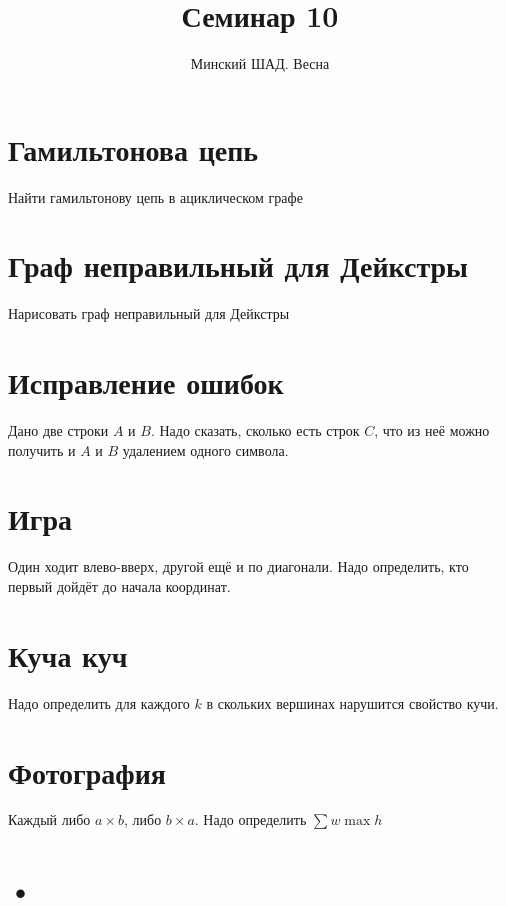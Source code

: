 \documentclass[addpoints]{exam}
\title{Семинар 10}
\author{Минский ШАД. Весна}
\begin{document}
\maketitle

\section{Гамильтонова цепь}

Найти гамильтонову цепь в ациклическом графе

\section{Граф неправильный для Дейкстры}

Нарисовать граф неправильный для Дейкстры

\section{Исправление ошибок}

Дано две строки $A$ и $B$. Надо сказать, сколько есть строк $C$, что из неё можно получить и $A$ и $B$ удалением одного символа.

\section{Игра}

Один ходит влево-вверх, другой ещё и по диагонали. Надо определить, кто первый дойдёт до начала координат.

\section{Куча куч}

Надо определить для каждого $k$ в скольких вершинах нарушится свойство кучи.

\section{Фотография}

Каждый либо $a \times b$, либо $b \times a$. Надо определить $\sum{w} \max{h}$

\section{•}
\end{document}
